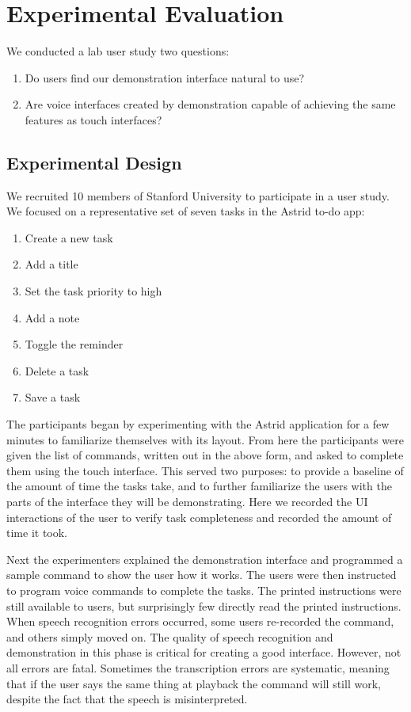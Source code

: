 \documentclass[letterpaper]{article}
\begin{document}
\section{Experimental Evaluation}
We conducted a lab user study two questions:
\begin{enumerate}
\item Do users find our demonstration interface natural to use?
\item Are voice interfaces created by demonstration capable of achieving the same features as touch interfaces?
\end{enumerate}

\subsection{Experimental Design}
We recruited 10 members of Stanford University to participate in a user study. We focused on a representative set of 
seven tasks in the Astrid to-do app:
\begin{enumerate}
\item Create a new task
\item Add a title
\item Set the task priority to high
\item Add a note
\item Toggle the reminder
\item Delete a task
\item Save a task
\end{enumerate}
The participants began by experimenting with the Astrid application for a few minutes to familiarize themselves with its layout.
From here the participants were given the list of commands, written out in the above form, and asked to complete them using
the touch interface. This served two purposes: to provide a baseline of the amount of time the tasks take, and to further
familiarize the users with the parts of the interface they will be demonstrating. Here we recorded the UI interactions
of the user to verify task completeness and recorded the amount of time it took.

Next the experimenters explained the demonstration interface and programmed a sample command to show the user how it works.
The users were then instructed to program voice commands to complete the tasks. The printed instructions were
still available to users, but surprisingly few directly read the printed instructions. When speech recognition errors
occurred, some users re-recorded the command, and others simply moved on. The quality of speech recognition and demonstration
in this phase is critical for creating a good interface. However, not all errors are fatal. Sometimes the transcription
errors are systematic, meaning that if the user says the same thing at playback the command will still work, despite
the fact that the speech is misinterpreted.
\end{document}
